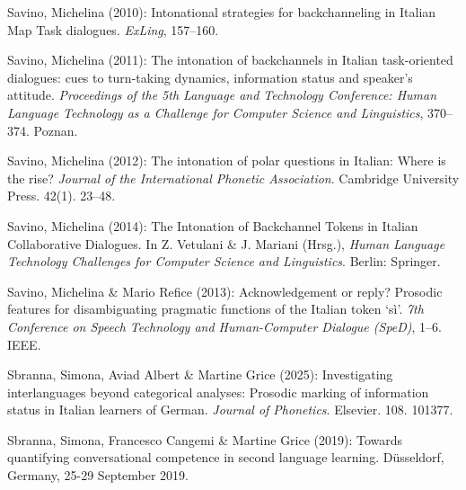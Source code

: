 \begin{styleBibliography}
Savino, Michelina (2010): Intonational strategies for backchanneling in Italian Map Task dialogues. \textit{ExLing}, 157–160.
\end{styleBibliography}

\begin{styleBibliography}
Savino, Michelina (2011): The intonation of backchannels in Italian task-oriented dialogues: cues to turn-taking dynamics, information status and speaker’s attitude. \textit{Proceedings of the 5th Language and Technology Conference: Human Language Technology as a Challenge for Computer Science and Linguistics}, 370–374. Poznan.
\end{styleBibliography}

\begin{styleBibliography}
Savino, Michelina (2012): The intonation of polar questions in Italian: Where is the rise? \textit{Journal of the International Phonetic Association}. Cambridge University Press. 42(1). 23–48.
\end{styleBibliography}

\begin{styleBibliography}
Savino, Michelina (2014): The Intonation of Backchannel Tokens in Italian Collaborative Dialogues. In Z. Vetulani \& J. Mariani (Hrsg.), \textit{Human Language Technology Challenges for Computer Science and Linguistics}. Berlin: Springer.
\end{styleBibliography}

\begin{styleBibliography}
Savino, Michelina \& Mario Refice (2013): Acknowledgement or reply? Prosodic features for disambiguating pragmatic functions of the Italian token ‘sì’. \textit{7th Conference on Speech Technology and Human-Computer Dialogue (SpeD)}, 1–6. IEEE.
\end{styleBibliography}

\begin{styleBibliography}
Sbranna, Simona, Aviad Albert \& Martine Grice (2025): Investigating interlanguages beyond categorical analyses: Prosodic marking of information status in Italian learners of German. \textit{Journal of Phonetics}. Elsevier. 108. 101377.
\end{styleBibliography}

\begin{styleBibliography}
Sbranna, Simona, Francesco Cangemi \& Martine Grice (2019): Towards quantifying conversational competence in second language learning. Düsseldorf, Germany, 25-29 September 2019.
\end{styleBibliography}

